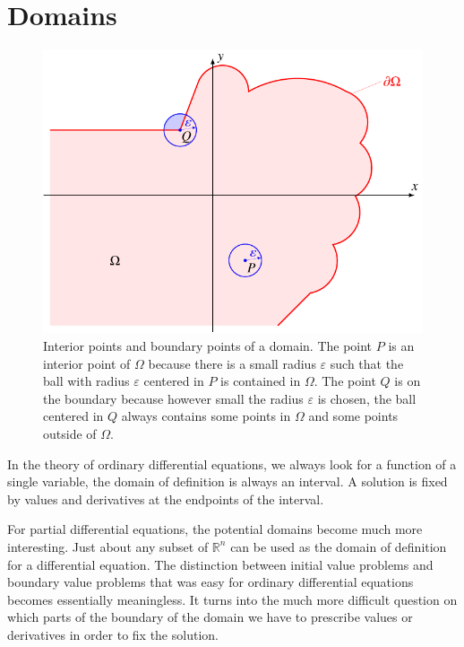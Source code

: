 %
% 
%
\section{Domains\label{klassifikation:gebiete}}
\label{domain}
\begin{figure}
\centering
\includegraphics{2-classification/images/domain.pdf}
\caption{Interior points and boundary points of a domain.
The point $P$ is an interior point of $\Omega$ because there is a
small radius $\varepsilon$ such that the ball with radius $\varepsilon$
centered in $P$ is contained in $\Omega$.
The point $Q$ is on the boundary because however small the radius
$\varepsilon$ is chosen, the ball centered in $Q$ always contains some
points in $\Omega$ and some points outside of $\Omega$.
\label{domain:figure}}
\end{figure}
In the theory of ordinary differential equations, we always look for a function
of a single variable, the domain of definition is always an interval.
A solution is fixed by values and derivatives at the endpoints of the interval.

For partial differential equations, the potential domains become much
more interesting.
Just about any subset of $\mathbb R^n$ can be used as the domain of
definition for a differential equation.
The distinction between initial value problems and boundary value
problems that was easy for ordinary differential equations becomes
essentially meaningless.
It turns into the much more difficult question on which parts of
the boundary of the domain we have to prescribe values or derivatives
in order to fix the solution.


